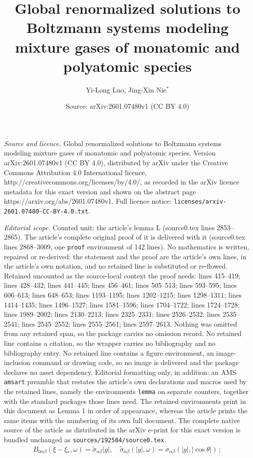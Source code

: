 \documentclass[10pt,a4paper]{amsart}
\title{Global renormalized solutions to Boltzmann systems modeling mixture gases of monatomic and polyatomic species}
\author{Yi-Long Luo, Jing-Xin Nie${}^*$}
\date{Source: arXiv:2601.07480v1 (CC BY 4.0)}
\begin{document}
\maketitle

\noindent\emph{Source and licence.} Global renormalized solutions to Boltzmann systems modeling mixture gases of monatomic and polyatomic species. Version arXiv:2601.07480v1 (CC BY 4.0), distributed by arXiv under the Creative Commons Attribution 4.0 International licence, http://creativecommons.org/licenses/by/4.0/, as recorded in the arXiv licence metadata for this exact version and shown on the abstract page https://arxiv.org/abs/2601.07480v1. Full licence notice: \texttt{licenses/arxiv-2601.07480-CC-BY-4.0.txt}.\par\smallskip

\noindent\textit{Editorial scope.} Counted unit: the article's lemma L (source0.tex lines 2853--2865). The article's complete original proof of it is delivered with it (source0.tex lines 2868--3009, one \texttt{proof} environment of 142 lines). No mathematics is written, repaired or re-derived: the statement and the proof are the article's own lines, in the article's own notation, and no retained line is substituted or re-flowed.  Retained uncounted as the source-local context the proof needs: lines 415--419; lines 428--432; lines 441--445; lines 456--461; lines 505--513; lines 593--595; lines 606--613; lines 648--653; lines 1193--1195; lines 1202--1215; lines 1298--1311; lines 1414--1435; lines 1496--1527; lines 1581--1596; lines 1704--1722; lines 1724--1728; lines 1989--2002; lines 2130--2213; lines 2325--2331; lines 2526--2532; lines 2535--2541; lines 2545--2552; lines 2555--2561; lines 2597--2613.  Nothing was omitted from any retained span, so the package carries no omission record.  No retained line contains a citation, so the wrapper carries no bibliography and no bibliography entry.  No retained line contains a figure environment, an image-inclusion command or drawing code, so no image is delivered and the package declares no asset dependency.  Editorial formatting only, in addition: an AMS \texttt{amsart} preamble that restates the article's own declarations and macros used by the retained lines, namely the environments \texttt{lemma} on separate counters, together with the standard packages those lines need.  The retained environments print in this document as Lemma 1 in order of appearance, whereas the article prints the same items with the numbering of its own full document.  The complete native source of the article as distributed in the arXiv e-print for this exact version is bundled unchanged as \texttt{sources/192504/source0.tex}.
    \begin{equation}\label{B0-ab}
        \begin{aligned}
            B_{0\alpha \beta } (\xi-\xi_*,\omega )=\tilde{\sigma}_{\alpha \beta }|g|,\quad \tilde{\sigma}_{\alpha \beta }(|g|,\omega)=\sigma_{\alpha \beta }(|g|,|\cos \theta|) \,;
        \end{aligned}
    \end{equation}
\end{document}
